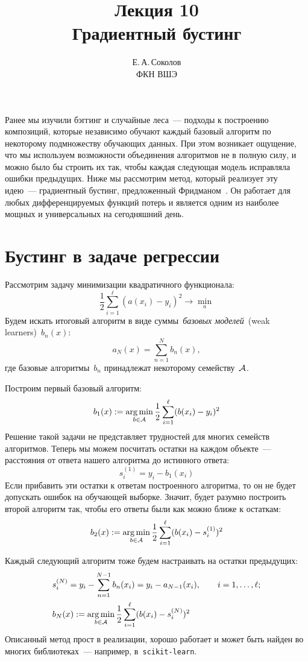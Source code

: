 \documentclass[12pt,fleqn]{article}
\begin{document}
\title{Лекция 10\\Градиентный бустинг}
\author{Е.\,А.\,Соколов\\ФКН ВШЭ}
\maketitle

Ранее мы изучили бэггинг и случайные леса~--- подходы к построению композиций, которые
независимо обучают каждый базовый алгоритм по некоторому подмножеству обучающих данных.
При этом возникает ощущение, что мы используем возможности объединения алгоритмов
не в полную силу, и можно было бы строить их так, чтобы каждая следующая модель
исправляла ошибки предыдущих.
Ниже мы рассмотрим метод, который реализует эту идею~--- градиентный бустинг,
предложенный Фридманом~\cite{friedman01gbm}.
Он работает для любых дифференцируемых функций потерь и является одним из наиболее
мощных и универсальных на сегодняшний день.

\section{Бустинг в задаче регрессии}\label{section:regBoost}
Рассмотрим задачу минимизации квадратичного функционала:
\[
    \frac12
    \sum_{i = 1}^{\ell}
        (a(x_i) - y_i)^2
    \to
    \min_{a}
\]
Будем искать итоговый алгоритм в виде суммы~\emph{базовых моделей}~(weak learners)~$b_n(x)$:
\[
    a_N(x)
    =
    \sum_{n = 1}^{N}
        b_n(x),
\]
где базовые алгоритмы~$b_n$ принадлежат некоторому семейству~$\AA$.

Построим первый базовый алгоритм:
\[
    b_1(x)
    :=
    \argmin_{b \in \AA}
        \frac12
        \sum_{i = 1}^{\ell}
            (b(x_i) - y_i)^2
\]
Решение такой задачи не представляет трудностей для многих семейств алгоритмов.
Теперь мы можем посчитать остатки на каждом объекте~--- расстояния от ответа
нашего алгоритма до истинного ответа:
\[
    s_i^{(1)} = y_i - b_1(x_i)
\]
Если прибавить эти остатки к ответам построенного алгоритма, то он не будет допускать
ошибок на обучающей выборке.
Значит, будет разумно построить второй алгоритм так, чтобы его ответы
были как можно ближе к остаткам:
\[
    b_2(x)
    :=
    \argmin_{b \in \AA}
        \frac12
        \sum_{i = 1}^{\ell}
            (b(x_i) - s_i^{(1)})^2
\]

Каждый следующий алгоритм тоже будем настраивать на остатки предыдущих:
\begin{align*}
    &s_i^{(N)}
    =
    y_i - \sum_{n = 1}^{N - 1} b_n(x_i)
    =
    y_i
    -
    a_{N - 1}(x_i),
    \qquad
    i = 1, \dots, \ell;\\
    &b_N(x)
    :=
    \argmin_{b \in \AA}
        \frac12
        \sum_{i = 1}^{\ell}
            (b(x_i) - s_i^{(N)})^2
\end{align*}
Описанный метод прост в реализации,
хорошо работает и может быть найден во многих библиотеках~---
например, в~\texttt{scikit-learn}.
\end{document}
